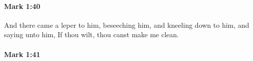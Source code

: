 		\paragraph{Mark 1:40} %
			\label{MARK-1-40}

			And there came a leper to him, beseeching him, and kneeling down to him, and saying unto him, If thou wilt, thou canst make me clean.

			\begin{framed}
			\scriptsize
				\begin{compactdesc}
					\item[SBLG] 
				\end{compactdesc}
			\end{framed}

		\paragraph{Mark 1:41} %
			\label{MARK-1-41}

